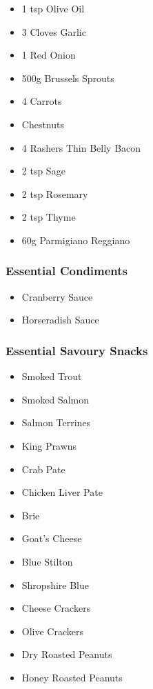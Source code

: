 \documentclass[11pt, english]{article}
\begin{document}
	\begin{itemize}
        \setlength\itemsep{0cm}
		\item 1 tsp Olive Oil
		\item 3 Cloves Garlic
		\item 1 Red Onion
		\item 500g Brussels Sprouts
		\item 4 Carrots
		\item Chestnuts
		\item 4 Rashers Thin Belly Bacon
		\item 2 tsp Sage
		\item 2 tsp Rosemary
		\item 2 tsp Thyme
		\item 60g Parmigiano Reggiano
	\end{itemize}

		\subsubsection*{Essential Condiments}

	\begin{itemize}
	\setlength\itemsep{0cm}
		\item Cranberry Sauce
		\item Horseradish Sauce
	\end{itemize}

		\subsubsection*{Essential Savoury Snacks}

	\begin{itemize}
	\setlength\itemsep{0cm}
		\item Smoked Trout
		\item Smoked Salmon
		\item Salmon Terrines
		\item King Prawns
		\item Crab Pate
		\item Chicken Liver Pate
		\item Brie
		\item Goat's Cheese
		\item Blue Stilton
		\item Shropshire Blue
		\item Cheese Crackers
		\item Olive Crackers
		\item Dry Roasted Peanuts
		\item Honey Roasted Peanuts
	\end{itemize}
\end{document}
